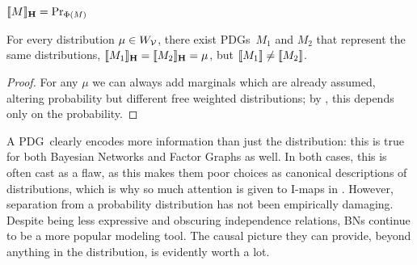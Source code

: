 \documentclass{article}
\newcommand\MaxEnt{_{\mathbf H}}
\newcommand{\MN}{PDG}
\newcommand{\MNs}{\MN s}
\numberwithin{equation}{section}
\begin{document}
	
	
	\begin{conj}\label{thm:noninj}
		$\bbr{M}\MaxEnt = \Pr_{\Phi(M)}$
	\end{conj}
	\begin{coro}\label{coro:same-dist;different-weight}
		For every distribution $\mu \in W_{\cal V}$, there exist \MNs\ $M_1$ and $M_2$ that represent the same distributions, $\bbr{M_1}\MaxEnt=\bbr{M_2}\MaxEnt=\mu$, but $\llbracket M_1\rrbracket \neq \llbracket M_2\rrbracket$. 
	\end{coro}
	\begin{proof}
		For any $\mu$ we can always add marginals which are already assumed, altering probability but different free weighted distributions; by , this depends only on the probability.
	\end{proof}
	
	A \MN\ clearly encodes more information than just the distribution: this is true for both Bayesian Networks and Factor Graphs as well. In both cases, this is often cast as a flaw, as this makes them poor choices as canonical descriptions of distributions, which is why so much attention is given to I-maps in \parencite{koller2009probabilistic}. However, separation from a probability distribution has not been empirically damaging. Despite being less expressive and obscuring independence relations, BNs continue to be a more popular modeling tool. The causal picture they can provide, beyond anything in the distribution, is evidently worth a lot.
\end{document}
